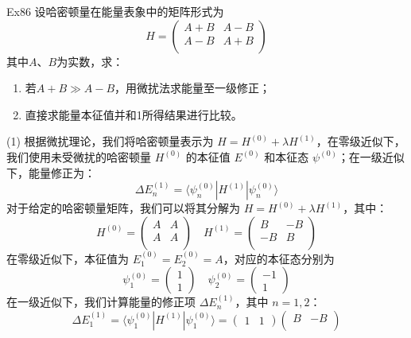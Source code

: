 \begin{question}{Ex86}
    设哈密顿量在能量表象中的矩阵形式为
    $$
        H=\begin{pmatrix}
            A+B & A-B \\
            A-B & A+B \\
        \end{pmatrix}
    $$
    其中$A$、$B$为实数，求：
    \begin{enumerate}
        \item 若$A+B \gg A-B$，用微扰法求能量至一级修正；
        \item 直接求能量本征值并和1所得结果进行比较。
    \end{enumerate}
\end{question}
\begin{solution}
    (1) 根据微扰理论，我们将哈密顿量表示为 $H = H^{(0)} + \lambda H^{(1)}$，在零级近似下，我们使用未受微扰的哈密顿量 $H^{(0)}$ 的本征值 $E^{(0)}$ 和本征态 $\psi^{(0)}$；在一级近似下，能量修正为：
    $$
        \Delta E^{(1)}_n = \langle \psi^{(0)}_n | H^{(1)} | \psi^{(0)}_n \rangle
    $$
    对于给定的哈密顿量矩阵，我们可以将其分解为 $H = H^{(0)} + \lambda H^{(1)}$，其中：
    $$
        H^{(0)} = \begin{pmatrix}
            A & A \\
            A & A \\
        \end{pmatrix}
        \quad
        H^{(1)} = \begin{pmatrix}
            B  & -B \\
            -B & B  \\
        \end{pmatrix}
    $$
    在零级近似下，本征值为 $E^{(0)}_1 = E^{(0)}_2 = A$，对应的本征态分别为
    $$
        \psi^{(0)}_1 = \begin{pmatrix} 1 \\ 1 \end{pmatrix}
        \quad
        \psi^{(0)}_2 = \begin{pmatrix} -1 \\ 1 \end{pmatrix}
    $$
    在一级近似下，我们计算能量的修正项 $\Delta E^{(1)}_n$，其中 $n = 1,2$：
    $$
        \Delta E^{(1)}_1
        = \langle \psi^{(0)}_1 | H^{(1)} | \psi^{(0)}_1 \rangle
        = \begin{pmatrix}
            1 & 1
        \end{pmatrix}\begin{pmatrix}
            B  & -B \\

\end{pmatrix}$$
\end{solution}
